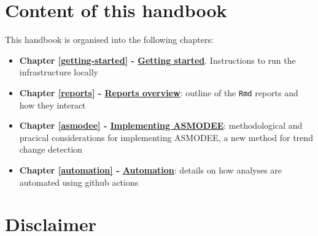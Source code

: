 \documentclass[]{book}
\begin{document}
\hypertarget{content-of-this-handbook}{%
\section{Content of this handbook}\label{content-of-this-handbook}}

This handbook is organised into the following chapters:

\begin{itemize}
\item
  \textbf{Chapter \ref{getting-started} - \protect\hyperlink{getting-started}{Getting started}}.
  Instructions to run the infrastructure locally
\item
  \textbf{Chapter \ref{reports} - \protect\hyperlink{reports}{Reports overview}}: outline of the
  \texttt{Rmd} reports and how they interact
\item
  \textbf{Chapter \ref{asmodee} - \protect\hyperlink{asmodee}{Implementing ASMODEE}}: methodological
  and pracical considerations for implementing ASMODEE, a new method for trend
  change detection
\item
  \textbf{Chapter \ref{automation} - \protect\hyperlink{automation}{Automation}}: details on how
  analyses are automated using github actions
\end{itemize}

\hypertarget{disclaimer}{%
\section{Disclaimer}\label{disclaimer}}
\end{document}
